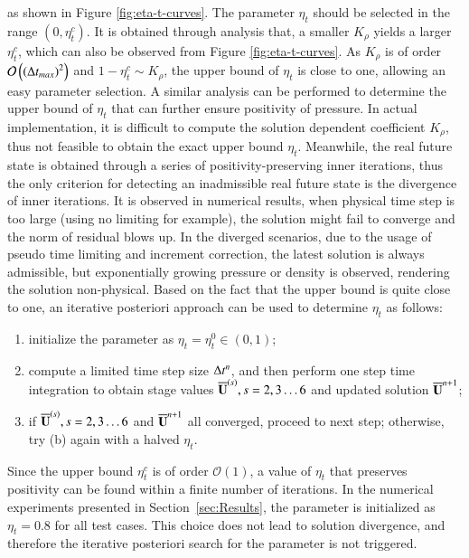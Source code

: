 as shown in Figure \ref{fig:eta-t-curves}.
The parameter $\eta_t$ should be selected in the range $\left(0,\eta^c_t\right)$. 
It is obtained through analysis that, 
a smaller $K_\rho$ yields a larger $\eta^c_t$,
which can also be observed from Figure \ref{fig:eta-t-curves}. 
As $K_\rho$ is of 
order $\mathcal{O}\left(\left(\mathrm\Delta t_{max}\right)^2\right)$
and $1-\eta_t^c\sim K_\rho$,
the upper bound of $\eta_t$ is close to one, allowing an easy parameter selection. 
A similar analysis can be performed to determine the upper bound of $\eta_t$ that can further ensure positivity of pressure. 
In actual implementation, it is difficult to compute the solution dependent coefficient $K_\rho$, thus not feasible to obtain the exact upper bound $\eta_t$. 
Meanwhile, the real future state is 
obtained through a series of positivity-preserving inner iterations,
thus the only criterion for detecting an inadmissible real future 
state is the divergence of inner iterations.
It is observed in numerical results, when physical time step is 
too large (using no limiting for example), the solution might   
fail to converge and the norm of residual blows up. 
In the diverged scenarios, due to the usage of pseudo time limiting 
and increment correction, the latest solution is always admissible, 
but exponentially growing pressure or density is observed, rendering the 
solution non-physical. 
Based on the fact that the upper bound is quite close to one, an 
iterative posteriori approach can be used to determine $\eta_t$ as follows:
\begin{enumerate} [label=(\alph*)]
    \item initialize the parameter as $\eta_t= \eta^0_t \in \left(0,1\right)$;
    \item compute a limited time step size $\mathrm\Delta t^n$, and then perform one step time integration to obtain stage values $\overline{\mathbf{U}}^{(s)},s=2,3\dots6$ and updated solution $\overline{\mathbf{U}}^{n+1}$;
    \item if $\overline{\mathbf{U}}^{(s)},s=2,3\dots6$ and $\overline{\mathbf{U}}^{n+1}$ all converged, proceed to next step; otherwise, try (b) again with a halved $\eta_t$.
\end{enumerate}
Since the upper bound $\eta^c_t$ is of order $\mathcal{O}(1)$, a value of $\eta_t$ that preserves positivity can be found within a finite number of iterations. 
In the numerical experiments presented in Section~\ref{sec:Results}, the parameter is initialized as $\eta_t = 0.8$ for all test cases. 
This choice does not lead to solution divergence, and therefore the iterative posteriori search for the parameter is not triggered.

